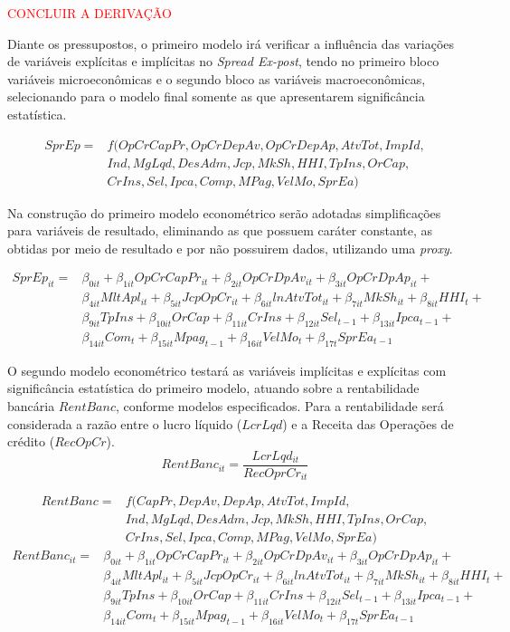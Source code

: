 \documentclass[12pt,openright,oneside,a4paper,chapter=TITLE,section=TITLE,subsection=TITLE,english,french,spanish,portugues,sumario=tradicional]{abntex2}
\begin{document}
\textcolor{red}{CONCLUIR A DERIVAÇÃO}

Diante os pressupostos, o primeiro modelo irá verificar a influência das variações de variáveis explícitas e implícitas no \emph{Spread Ex-post}, tendo no primeiro bloco variáveis microeconômicas e o segundo bloco as variáveis macroeconômicas, selecionando para o modelo final somente as que apresentarem significância estatística.

\[\begin{aligned}
SprEp = &f(OpCrCapPr, OpCrDepAv, OpCrDepAp, AtvTot, ImpId, \\ 
& Ind, MgLqd, DesAdm, Jcp, MkSh,  HHI, TpIns, OrCap, \\ 
& CrIns, Sel, Ipca, Comp, MPag, VelMo, SprEa)
\end{aligned}\]

Na construção do primeiro modelo econométrico serão adotadas simplificações para variáveis de resultado, eliminando as que possuem caráter constante, as obtidas por meio de resultado e por não possuirem dados, utilizando uma \emph{proxy}.

\[\begin{aligned}
SprEp_{it} = & \beta_{0it} + \beta_{1it}OpCrCapPr_{it} + \beta_{2it}OpCrDpAv_{it} + \beta_{3it}OpCrDpAp_{it} + \\
&\beta_{4it}MltApl_{it} + \beta_{5it}JcpOpCr_{it}  + \beta_{6it}lnAtvTot_{it} + \beta_{7it}MkSh_{it}  + \beta_{8it}HHI_{t} + \\
& \beta_{9it}TpIns + \beta_{10it}OrCap + \beta_{11it}CrIns + \beta_{12it}Sel_{t-1} + \beta_{13it}Ipca_{t-1} + \\
& \beta_{14it}Com_{t} + \beta_{15it}Mpag_{t-1} + \beta_{16it}VelMo_{t} +  \beta_{17t}SprEa_{t-1}
\end{aligned}\]

O segundo modelo econométrico testará as variáveis implícitas e explícitas com significância estatística do primeiro modelo, atuando sobre a rentabilidade bancária \(RentBanc\), conforme modelos especificados. Para a rentabilidade será considerada a razão entre o lucro líquido (\(LcrLqd\)) e a Receita das Operações de crédito (\(RecOpCr\)).
\[
RentBanc_{it} = \frac{LcrLqd_{it}}{RecOprCr_{it}}
\]

\[\begin{aligned}
RentBanc = & f(CapPr, DepAv, DepAp, AtvTot, ImpId, \\ 
& Ind, MgLqd, DesAdm, Jcp, MkSh,  HHI, TpIns, OrCap, \\ 
& CrIns, Sel, Ipca, Comp, MPag, VelMo, SprEa)
\end{aligned}\]
\[\begin{aligned}
RentBanc_{it} = & \beta_{0it} + \beta_{1it}OpCrCapPr_{it} + \beta_{2it}OpCrDpAv_{it} + \beta_{3it}OpCrDpAp_{it} + \\
&\beta_{4it}MltApl_{it} + \beta_{5it}JcpOpCr_{it}  + \beta_{6it}lnAtvTot_{it} + \beta_{7it}MkSh_{it}  + \beta_{8it}HHI_{t} + \\
& \beta_{9it}TpIns + \beta_{10it}OrCap + \beta_{11it}CrIns + \beta_{12it}Sel_{t-1} + \beta_{13it}Ipca_{t-1} + \\
& \beta_{14it}Com_{t} + \beta_{15it}Mpag_{t-1} + \beta_{16it}VelMo_{t} +  \beta_{17t}SprEa_{t-1}
\end{aligned}\]
\end{document}
